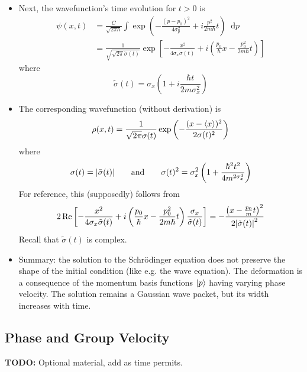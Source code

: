 \documentclass[11pt, a4paper]{article}
\newcommand{\diff}{\mathop{}\!\mathrm{d}} %
\newcommand{\eqtext}[1]{\qquad \text{#1} \qquad}
\newcommand{\Schro}{Schr\"{o}dinger\xspace}
\renewcommand{\t}[1]{\tilde{#1}}
\begin{document}
\begin{itemize}
	\item Next, the wavefunction's time evolution for $ t > 0 $ is 
	\begin{align*}
		\psi(x, t) &= \frac{C}{\sqrt{2\pi \hbar}}\int \exp(-\frac{(p-p_{0})^{2}}{4\sigma_{p}^{2}} + i \frac{p^{2}}{2m\hbar}t)\diff p\\
		& =  \frac{1}{\sqrt{\sqrt{2\pi}\tilde{\sigma}(t)}} \exp\left[-\frac{x^{2}}{4\sigma_{x}\tilde{\sigma}(t)} + i\left(\frac{p_{0}}{\hbar}x - \frac{p_{0}^{2}}{2m\hbar}t\right)\right]
	\end{align*}
	where
	\begin{equation*}
		\tilde{\sigma}(t) = \sigma_{x}\left(1 + i \frac{\hbar t}{2m\sigma_{x}^{2}}\right)
	\end{equation*}
	
	\item The corresponding wavefunction (without derivation) is
	\begin{equation*}
		\rho(x, t) = \frac{1}{\sqrt{2\pi}\sigma(t)}\exp\left(-\frac{(x- \ev{x})^{2}}{2\sigma(t)^{2}}\right)
	\end{equation*}
	where
	\begin{equation*}
		\sigma(t) = \abs{\tilde{\sigma}(t)} \eqtext{and} \sigma(t)^{2} = \sigma_{x}^{2}\left(1 + \frac{\hbar^{2}t^{2}}{4m^{2\sigma_{x}^{4}}}\right)
	\end{equation*}
	For reference, this (supposedly) follows from
	\begin{equation*}
		2 \Re \left[- \frac{x^{2}}{4\sigma_{x}\tilde{\sigma}(t)} + i\left(\frac{p_{0}}{\hbar}x - \frac{p_{0}^{2}}{2m\hbar}t\right)\frac{\sigma_{x}}{\t{\sigma}(t)}\right] = - \frac{\left(x - \frac{p_{0}}{m}t\right)^{2}}{2 \abs{\t{\sigma}(t)}^{2}}
	\end{equation*}
	Recall that $ \t{\sigma}(t) $ is complex.
	
	\item Summary: the solution to the \Schro equation does not preserve the shape of the initial condition (like e.g. the wave equation). The deformation is a consequence of the momentum basis functions $ \ket{p} $ having varying phase velocity. The solution remains a Gaussian wave packet, but its width increases with time.
	
\end{itemize}

\subsection{Phase and Group Velocity}
\textbf{TODO:} Optional material, add as time permits.
\end{document}
